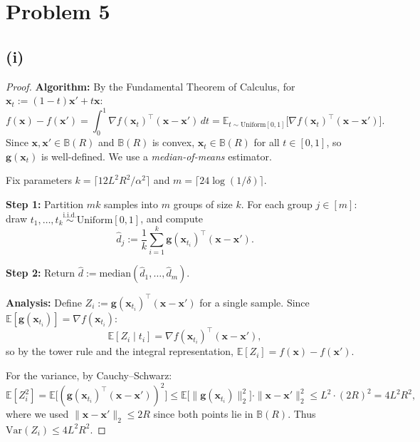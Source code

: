 \section*{Problem 5}
\subsection*{(i)}

\begin{proof}
\textbf{Algorithm:}
By the Fundamental Theorem of Calculus, for $\mathbf{x}_t := (1-t)\mathbf{x}' + t\mathbf{x}$:
\[
f(\mathbf{x}) - f(\mathbf{x}') = \int_0^1 \nabla f(\mathbf{x}_t)^\top (\mathbf{x} - \mathbf{x}')\,dt = \mathbb{E}_{t \sim \mathrm{Uniform}[0,1]}\bigl[\nabla f(\mathbf{x}_t)^\top (\mathbf{x} - \mathbf{x}')\bigr].
\]
Since $\mathbf{x}, \mathbf{x}' \in \mathbb{B}(R)$ and $\mathbb{B}(R)$ is convex, $\mathbf{x}_t \in \mathbb{B}(R)$ for all $t \in [0,1]$, so $\mathbf{g}(\mathbf{x}_t)$ is well-defined. We use a \emph{median-of-means} estimator.

Fix parameters $k = \lceil 12L^2R^2/\alpha^2 \rceil$ and $m = \lceil 24\log(1/\delta) \rceil$.

\textbf{Step 1:} Partition $mk$ samples into $m$ groups of size $k$. For each group $j \in [m]$: draw $t_1, \ldots, t_k \stackrel{\text{i.i.d.}}{\sim} \mathrm{Uniform}[0,1]$, and compute
\[
\hat{d}_j := \frac{1}{k}\sum_{i=1}^{k} \mathbf{g}(\mathbf{x}_{t_i})^\top (\mathbf{x} - \mathbf{x}').
\]

\textbf{Step 2:} Return $\hat{d} := \mathrm{median}(\hat{d}_1, \ldots, \hat{d}_m)$.

\medskip
\textbf{Analysis:}
Define $Z_i := \mathbf{g}(\mathbf{x}_{t_i})^\top (\mathbf{x} - \mathbf{x}')$ for a single sample. Since $\mathbb{E}[\mathbf{g}(\mathbf{x}_{t_i})] = \nabla f(\mathbf{x}_{t_i})$:
\[
\mathbb{E}[Z_i \mid t_i] = \nabla f(\mathbf{x}_{t_i})^\top (\mathbf{x} - \mathbf{x}'),
\]
so by the tower rule and the integral representation, $\mathbb{E}[Z_i] = f(\mathbf{x}) - f(\mathbf{x}')$.

For the variance, by Cauchy--Schwarz:
\[
\mathbb{E}[Z_i^2] = \mathbb{E}\bigl[(\mathbf{g}(\mathbf{x}_{t_i})^\top (\mathbf{x} - \mathbf{x}'))^2\bigr] \leq \mathbb{E}\bigl[\|\mathbf{g}(\mathbf{x}_{t_i})\|_2^2\bigr] \cdot \|\mathbf{x} - \mathbf{x}'\|_2^2 \leq L^2 \cdot (2R)^2 = 4L^2R^2,
\]
where we used $\|\mathbf{x} - \mathbf{x}'\|_2 \leq 2R$ since both points lie in $\mathbb{B}(R)$. Thus $\mathrm{Var}(Z_i) \leq 4L^2R^2$.


\end{proof}
